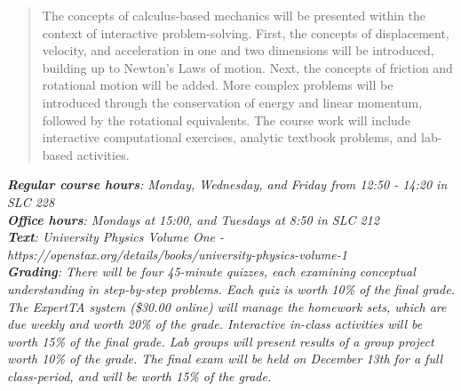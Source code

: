 \documentclass[10pt]{article}
\begin{document}
\maketitle

\begin{abstract}
The concepts of calculus-based mechanics will be presented within the context of interactive problem-solving.  First, the concepts of displacement, velocity, and acceleration in one and two dimensions will be introduced, building up to Newton's Laws of motion.  Next, the concepts of friction and rotational motion will be added.  More complex problems will be introduced through the conservation of energy and linear momentum, followed by the rotational equivalents.  The course work will include interactive computational exercises, analytic textbook problems, and lab-based activities.
\end{abstract}
\noindent
\textit{\textbf{Regular course hours}: Monday, Wednesday, and Friday from 12:50 - 14:20 in SLC 228} \\
\textit{\textbf{Office hours}: Mondays at 15:00, and Tuesdays at 8:50 in SLC 212} \\
\textit{\textbf{Text}: University Physics Volume One -  https://openstax.org/details/books/university-physics-volume-1} \\
\textit{\textbf{Grading}: There will be four 45-minute quizzes, each examining conceptual understanding in step-by-step problems.  Each quiz is worth 10\% of the final grade.  The ExpertTA system (\$30.00 online) will manage the homework sets, which are due weekly and worth 20\% of the grade.  Interactive in-class activities will be worth 15\% of the final grade.  Lab groups will present results of a group project worth 10\% of the grade. The final exam will be held on December 13th for a full class-period, and will be worth 15\% of the grade.}
\end{document}
